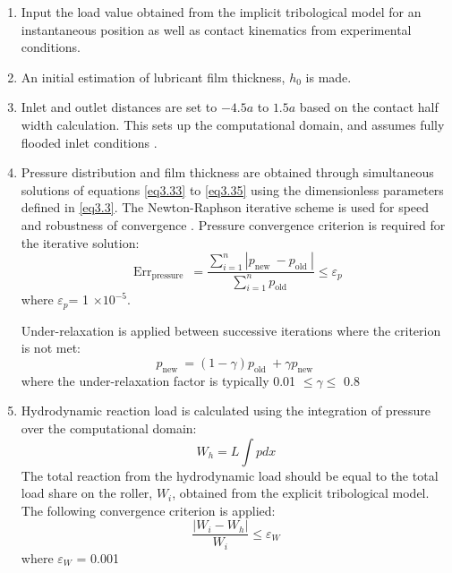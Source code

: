 \begin{enumerate} %
	\item Input the load value obtained from the implicit tribological model for an instantaneous position as well as contact kinematics from experimental conditions.
	\item An initial estimation of lubricant film thickness, $h_0$ is made.
	\item Inlet and outlet distances are set to $-4.5a$ to $1.5a$ based on the contact half width calculation. This sets up the computational domain, and assumes fully flooded inlet conditions \cite{Hamrock1976}. 
	\item Pressure distribution and film thickness are obtained through simultaneous solutions of equations \ref{eq3.33} to \ref{eq3.35} using the dimensionless parameters defined in \ref{eq3.3}. The Newton-Raphson iterative scheme is used for speed and robustness of convergence \cite{Okumara1982}. Pressure convergence criterion is required for the iterative solution:
	\begin{equation}\label{eq3.39}
		\operatorname{Err}_{\text {pressure }}=\frac{\sum_{i=1}^n\left|p_{\text {new }}-p_{\text {old }}\right|}{\sum_{i=1}^n p_{\text {old }}} \leq \varepsilon_p
	\end{equation}
	where $\varepsilon_p$= 1 $\times 10^{-5}$.
	
	Under-relaxation is applied between successive iterations where the criterion is not met:
	\begin{equation}\label{Under relaxation}
		p_{\text {new }}=(1-\gamma) p_{\text {old }}+\gamma p_{\text {new }}
	\end{equation}
	where the under-relaxation factor is typically 0.01 $\le\gamma\le$ 0.8
	
	\item Hydrodynamic reaction load is calculated using the integration of pressure over the computational domain:
	\begin{equation}\label{Reaction load integration EHL}
		W_h=L \int p d x
	\end{equation}
	The total reaction from the hydrodynamic load should be equal to the total load share on the roller, $W_i$, obtained from the explicit tribological model. The following convergence criterion is applied:
	\begin{equation}
		\frac{\left|W_i-W_h\right|}{W_i} \leq \varepsilon_W
	\end{equation}
	where $\varepsilon_W$ = 0.001 
\end{enumerate}

